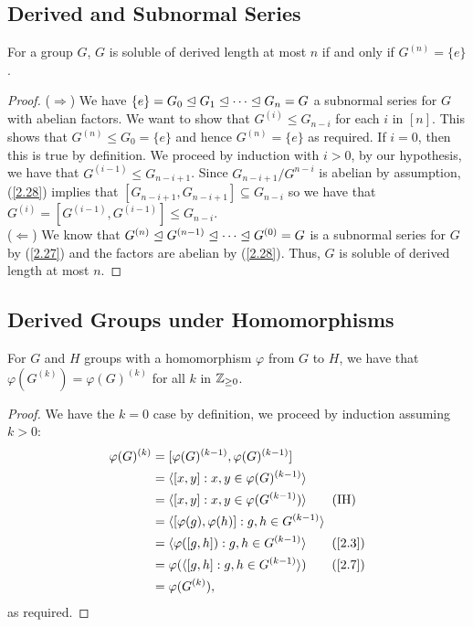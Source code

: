 \subsection{Derived and Subnormal Series} \label{8.3}

For a group $G$, $G$ is soluble of derived length at most $n$ if
and only if $G^{(n)} = \{e\}$.

\begin{proof}
    ($\Longrightarrow$) We have
    $\{e\} = G_0 \trianglelefteq G_1 \trianglelefteq \cdots \trianglelefteq G_n = G$ a
    subnormal series for $G$ with abelian factors. We want to
    show that $G^{(i)} \leq G_{n - i}$ for each $i$ in $[n]$.
    This shows that $G^{(n)} \leq G_0 = \{e\}$ and hence 
    $G^{(n)} = \{e\}$ as required. If $i = 0$, then this is
    true by definition. We proceed by induction with $i > 0$,
    by our hypothesis, we have that $G^{(i - 1)} \leq G_{n - i + 1}$.
    Since $G_{n - i + 1}/G^{n - i}$ is abelian by assumption, (\ref{2.28})
    implies that $[G_{n - i + 1}, G_{n - i + 1}] \subseteq G_{n - i}$
    so we have that
    $G^{(i)} = [G^{(i - 1)}, G^{(i - 1)}] \leq G_{n - i}$.
    \\[\baselineskip]
    ($\Longleftarrow$) We know that 
    $G^{(n)} \trianglelefteq G^{(n - 1)} \trianglelefteq \cdots \trianglelefteq G^{(0)} = G$
    is a subnormal series for $G$ by (\ref{2.27}) and the factors
    are abelian by (\ref{2.28}). Thus, $G$ is soluble of derived length
    at most $n$.
\end{proof}

\subsection{Derived Groups under Homomorphisms} \label{8.4}

For $G$ and $H$ groups with a homomorphism $\varphi$ from $G$ to $H$,
we have that $\varphi(G^{(k)}) = \varphi(G)^{(k)}$ for all $k$ in
$\mathbb{Z}_{\geq 0}$. 

\begin{proof}
    We have the $k = 0$ case by definition, we proceed by induction
    assuming $k > 0$: \begin{align*}
        \varphi(G)^{(k)} 
        &= [\varphi(G)^{(k - 1)}, \varphi(G)^{(k - 1)}] \\
        &= \ang{[x, y] : x, y \in \varphi(G)^{(k - 1)}} \\
        &= \ang{[x, y] : x, y \in \varphi(G^{(k - 1)})} \tag{IH} \\
        &= \ang{[\varphi(g), \varphi(h)] : g, h \in G^{(k - 1)}} \\
        &= \ang{\varphi([g, h]) : g, h \in G^{(k - 1)}} \tag{\ref{2.3}} \\
        &= \varphi(\ang{[g, h] : g, h \in G^{(k - 1)}}) \tag{\ref{2.7}} \\
        &= \varphi(G^{(k)}),
    \end{align*} as required.
\end{proof}

